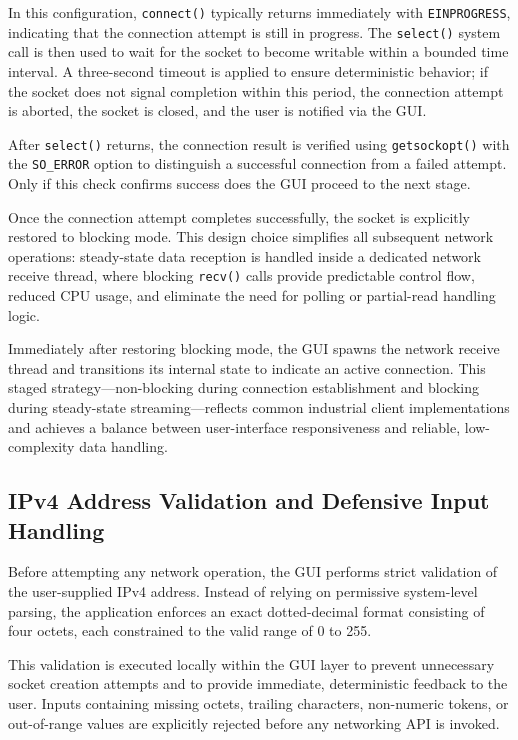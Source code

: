 In this configuration, \texttt{connect()} typically returns immediately with
\texttt{EINPROGRESS}, indicating that the connection attempt is still in
progress. The \texttt{select()} system call is then used to wait for the
socket to become writable within a bounded time interval. A three-second
timeout is applied to ensure deterministic behavior; if the socket does not
signal completion within this period, the connection attempt is aborted, the
socket is closed, and the user is notified via the GUI.

After \texttt{select()} returns, the connection result is verified using
\texttt{getsockopt()} with the \texttt{SO\_ERROR} option to distinguish a
successful connection from a failed attempt. Only if this check confirms
success does the GUI proceed to the next stage.

Once the connection attempt completes successfully, the socket is explicitly
restored to blocking mode. This design choice simplifies all subsequent
network operations: steady-state data reception is handled inside a dedicated
network receive thread, where blocking \texttt{recv()} calls provide
predictable control flow, reduced CPU usage, and eliminate the need for
polling or partial-read handling logic.

Immediately after restoring blocking mode, the GUI spawns the network receive
thread and transitions its internal state to indicate an active connection.
This staged strategy---non-blocking during connection establishment and
blocking during steady-state streaming---reflects common industrial client
implementations and achieves a balance between user-interface responsiveness
and reliable, low-complexity data handling.

\subsection{IPv4 Address Validation and Defensive Input Handling}
Before attempting any network operation, the GUI performs strict validation of the user-supplied IPv4 address. Instead of relying on permissive system-level parsing, the application enforces an exact dotted-decimal format consisting of four octets, each constrained to the valid range of 0 to 255.

This validation is executed locally within the GUI layer to prevent unnecessary socket creation attempts and to provide immediate, deterministic feedback to the user. Inputs containing missing octets, trailing characters, non-numeric tokens, or out-of-range values are explicitly rejected before any networking API is invoked.

